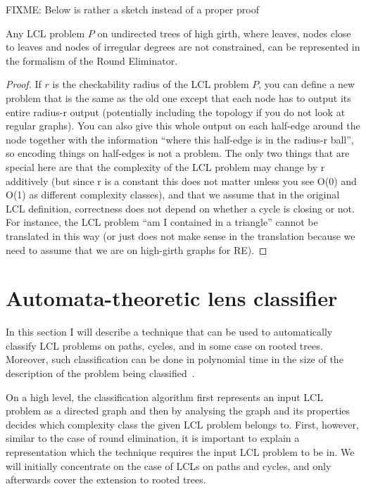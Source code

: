 FIXME: Below is rather a sketch instead of a proper proof
\begin{theorem}\label{theorem:re_formalism_is_general}
Any LCL problem $P$ on undirected trees of high girth, where
leaves, nodes close to leaves and nodes of irregular degrees are
not constrained, can be represented in the formalism of the
Round Eliminator.
\end{theorem}
\begin{proof}
  If $r$ is the checkability radius of the LCL problem $P$, you can define a new problem that is the same as the old one except that each node has to output its entire radius-r output (potentially including the topology if you do not look at regular graphs). You can also give this whole output on each half-edge around the node together with the information ``where this half-edge is in the radius-r ball'', so encoding things on half-edges is not a problem.
  The only two things that are special here are that the complexity of the LCL problem may change by r additively (but since r is a constant this does not matter unless you see O(0) and O(1) as different complexity classes), and that we assume that in the original LCL definition, correctness does not depend on whether a cycle is closing or not. For instance, the LCL problem ``am I contained in a triangle'' cannot be translated in this way (or just does not make sense in the translation because we need to assume that we are on high-girth graphs for RE).
\end{proof}

\section{Automata-theoretic lens classifier}

In this section I will describe a technique that can be used to automatically
classify LCL problems on paths, cycles, and in some case on rooted trees.
Moreover, such classification can be done in polynomial time in the size
of the description of the problem being classified~\cite{Chang2020}.

On a high level, the classification algorithm first represents an input LCL problem as
a directed graph and then by analysing the graph and its properties decides
which complexity class the given LCL problem belongs to. First, however, similar to
the case of round elimination, it is important to explain a representation which
the technique requires the input LCL problem to be in. We will initially concentrate on the case
of LCLs on paths and cycles, and only afterwards cover the extension to rooted trees.

